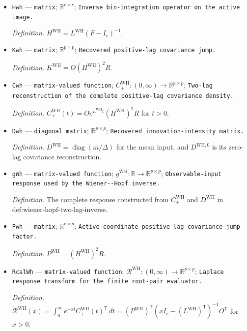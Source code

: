 \documentclass{article}
\begin{document}
\begin{itemize}
  \item \texttt{Hwh} --- \texttt{matrix}; \(\mathbb R^{r\times r}\); \texttt{Inverse bin-\allowbreak{}integration operator on the active image.}
  \par\smallskip\noindent\emph{Definition.} \(H^{\mathrm{WH}}=L^{\mathrm{WH}}(F-I_r)^{-1}\).
  \item \texttt{Kwh} --- \texttt{matrix}; \(\mathbb R^{p\times p}\); \texttt{Recovered positive-\allowbreak{}lag covariance jump.}
  \par\smallskip\noindent\emph{Definition.} \(K^{\mathrm{WH}}=O(H^{\mathrm{WH}})^2R\).
  \item \texttt{Cwh} --- \texttt{matrix-\allowbreak{}valued function}; \(C_{+}^{\mathrm{WH}}:(0,\infty)\to\mathbb R^{p\times p}\); \texttt{Two-\allowbreak{}lag reconstruction of the complete positive-\allowbreak{}lag covariance density.}
  \par\smallskip\noindent\emph{Definition.} \(C_{+}^{\mathrm{WH}}(t)=Oe^{L^{\mathrm{WH}}t}(H^{\mathrm{WH}})^2R\) for \(t>0\).
  \item \texttt{Dwh} --- \texttt{diagonal matrix}; \(\mathbb R^{p\times p}\); \texttt{Recovered innovation-\allowbreak{}intensity matrix.}
  \par\smallskip\noindent\emph{Definition.} \(D^{\mathrm{WH}}=\operatorname{diag}(m/\Delta)\) for the mean input, and \(D^{\mathrm{WH},0}\) is its zero-lag covariance reconstruction.
  \item \texttt{gWh} --- \texttt{matrix-\allowbreak{}valued function}; \(g^{\mathrm{WH}}:\mathbb R\to\mathbb R^{p\times p}\); \texttt{Observable-\allowbreak{}input response used by the Wiener-\allowbreak{}-\allowbreak{}Hopf inverse.}
  \par\smallskip\noindent\emph{Definition.} The complete response constructed from \(C_{+}^{\mathrm{WH}}\) and \(D^{\mathrm{WH}}\) in \(\text{def:wiener-hopf-two-lag-inverse}\).
  \item \texttt{Pwh} --- \texttt{matrix}; \(\mathbb R^{r\times p}\); \texttt{Active-\allowbreak{}coordinate positive-\allowbreak{}lag covariance-\allowbreak{}jump factor.}
  \par\smallskip\noindent\emph{Definition.} \(P^{\mathrm{WH}}=(H^{\mathrm{WH}})^2R\).
  \item \texttt{RcalWh} --- \texttt{matrix-\allowbreak{}valued function}; \(\mathcal R^{\mathrm{WH}}:(0,\infty)\to\mathbb R^{p\times p}\); \texttt{Laplace response transform for the finite root-\allowbreak{}pair evaluator.}
  \par\smallskip\noindent\emph{Definition.} \(\mathcal R^{\mathrm{WH}}(x)=\int_0^\infty e^{-xt}C_{+}^{\mathrm{WH}}(t)^{\mathsf T}\,dt=(P^{\mathrm{WH}})^{\mathsf T}(xI_r-(L^{\mathrm{WH}})^{\mathsf T})^{-1}O^{\mathsf T}\) for \(x>0\).

\end{itemize}
\end{document}
